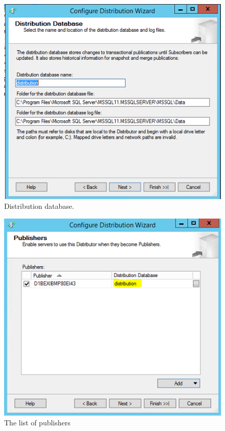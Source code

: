 \documentclass[english]{article}
\begin{document}
\begin{figure}[H]
\centerline{\includegraphics[scale=0.8]{administration/rep/6}}
\caption{ Distribution database.}
\end{figure}

\begin{figure}[H]
\centerline{\includegraphics[scale=0.8]{administration/rep/7}}
\caption{The list of publishers}
\end{figure}
\end{document}
